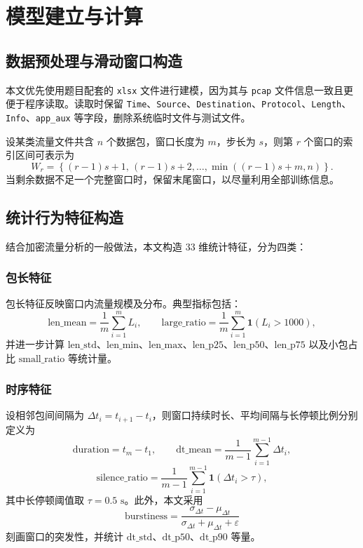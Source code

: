 \documentclass[UTF8,a4paper,12pt]{ctexart}
\begin{document}
\section{模型建立与计算}

\subsection{数据预处理与滑动窗口构造}
本文优先使用题目配套的 \texttt{xlsx} 文件进行建模，因为其与 \texttt{pcap} 文件信息一致且更便于程序读取。读取时保留 \texttt{Time}、\texttt{Source}、\texttt{Destination}、\texttt{Protocol}、\texttt{Length}、\texttt{Info}、\texttt{app\_aux} 等字段，删除系统临时文件与测试文件。

设某类流量文件共含 $n$ 个数据包，窗口长度为 $m$，步长为 $s$，则第 $r$ 个窗口的索引区间可表示为
\[
W_r = \left\{(r-1)s+1,\,(r-1)s+2,\ldots,\min((r-1)s+m,n)\right\}.
\]
当剩余数据不足一个完整窗口时，保留末尾窗口，以尽量利用全部训练信息。

\subsection{统计行为特征构造}
结合加密流量分析的一般做法，本文构造 33 维统计特征，分为四类：

\subsubsection{包长特征}
包长特征反映窗口内流量规模及分布。典型指标包括：
\[
\mathrm{len\_mean}=\frac1m\sum_{i=1}^m L_i,\qquad
\mathrm{large\_ratio}=\frac1m\sum_{i=1}^m \mathbf{1}(L_i>1000),
\]
并进一步计算 $\mathrm{len\_std}$、$\mathrm{len\_min}$、$\mathrm{len\_max}$、$\mathrm{len\_p25}$、$\mathrm{len\_p50}$、$\mathrm{len\_p75}$ 以及小包占比 $\mathrm{small\_ratio}$ 等统计量。

\subsubsection{时序特征}
设相邻包间间隔为 $\Delta t_i=t_{i+1}-t_i$，则窗口持续时长、平均间隔与长停顿比例分别定义为
\[
\mathrm{duration}=t_m-t_1,\qquad
\mathrm{dt\_mean}=\frac1{m-1}\sum_{i=1}^{m-1}\Delta t_i,
\]
\[
\mathrm{silence\_ratio}=\frac1{m-1}\sum_{i=1}^{m-1}\mathbf{1}(\Delta t_i>\tau),
\]
其中长停顿阈值取 $\tau=0.5\text{ s}$。此外，本文采用
\[
\mathrm{burstiness}=\frac{\sigma_{\Delta t}-\mu_{\Delta t}}{\sigma_{\Delta t}+\mu_{\Delta t}+\varepsilon}
\]
刻画窗口的突发性，并统计 $\mathrm{dt\_std}$、$\mathrm{dt\_p50}$、$\mathrm{dt\_p90}$ 等量。
\end{document}
